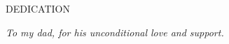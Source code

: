 \newpage
\thispagestyle{empty}

\begin{center}
  DEDICATION\\
\end{center}

\noindent \textit{To my dad, for his unconditional love and support.}
